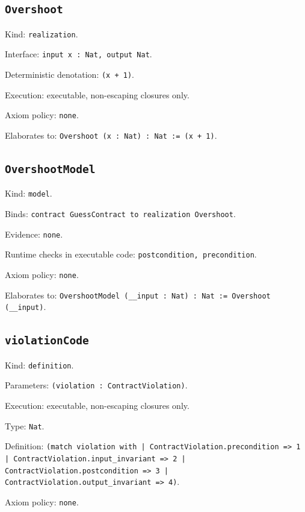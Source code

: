 \documentclass[11pt]{article}
\begin{document}
\subsection*{\texttt{Overshoot}}
\noindent Kind: \texttt{realization}.\par
\noindent Interface: \texttt{input x : Nat, output Nat}.\par
\noindent Deterministic denotation: \texttt{(x + 1)}.\par
\noindent Execution: executable, non-escaping closures only.\par
\noindent Axiom policy: \texttt{none}.\par
\noindent Elaborates to: \texttt{Overshoot (x : Nat) : Nat := (x + 1)}.\par
\subsection*{\texttt{OvershootModel}}
\noindent Kind: \texttt{model}.\par
\noindent Binds: \texttt{contract GuessContract to realization Overshoot}.\par
\noindent Evidence: \texttt{none}.\par
\noindent Runtime checks in executable code: \texttt{postcondition, precondition}.\par
\noindent Axiom policy: \texttt{none}.\par
\noindent Elaborates to: \texttt{OvershootModel (\_\_input : Nat) : Nat := Overshoot (\_\_input)}.\par
\subsection*{\texttt{violationCode}}
\noindent Kind: \texttt{definition}.\par
\noindent Parameters: \texttt{(violation : ContractViolation)}.\par
\noindent Execution: executable, non-escaping closures only.\par
\noindent Type: \texttt{Nat}.\par
\noindent Definition: \texttt{(match violation with | ContractViolation.precondition => 1 | ContractViolation.input\_invariant => 2 | ContractViolation.postcondition => 3 | ContractViolation.output\_invariant => 4)}.\par
\noindent Axiom policy: \texttt{none}.\par
\end{document}
